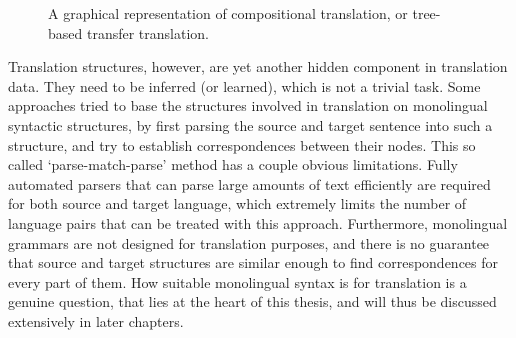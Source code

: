 \documentclass{report}
\theoremstyle{break}
\begin{document}
\begin{figure}
\centering
{}
\caption{A graphical representation of compositional translation, or tree-based transfer translation.}\label{fig:comptrans}
\end{figure}

Translation structures, however, are yet another hidden component in translation data. They need to be inferred (or learned), which is not a trivial task. Some approaches tried to base the structures involved in translation on monolingual syntactic structures, by first parsing the source and target sentence into such a structure, and try to establish correspondences between their nodes. This so called `parse-match-parse' method has a couple obvious limitations. Fully automated parsers that can parse large amounts of text efficiently are required for both source and target language, which extremely limits the number of language pairs that can be treated with this approach. Furthermore, monolingual grammars are not designed for translation purposes, and there is no guarantee that source and target structures are similar enough to find correspondences for every part of them. How suitable monolingual syntax is for translation is a genuine question, that lies at the heart of this thesis, and will thus be discussed extensively in later chapters.
\end{document}
